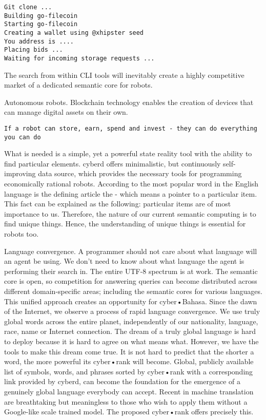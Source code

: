 \documentclass[8pt,oneside]{amsart}
\newcommand{\linkgreen}[2]{\href{#1}{\color{green}{#2}}}
\newcommand{\code}[1]{{\PlayBold #1}}
\begin{document}
\begin{Abstract}
\begin{lstlisting}
Git clone ...
Building go-filecoin
Starting go-filecoin
Creating a wallet using @xhipster seed
You address is ....
Placing bids ...
Waiting for incoming storage requests ...

\end{lstlisting}

The search from within CLI tools will inevitably create a highly competitive market of a dedicated semantic core for robots.

\code{Autonomous robots}. Blockchain technology enables the creation of devices that can manage digital assets on their own.

\begin{lstlisting}
If a robot can store, earn, spend and invest - they can do everything you can do
\end{lstlisting}

What is needed is a simple, yet a powerful state reality tool with the ability to find particular elements. \code{cyberd} offers minimalistic, but continuously self-improving data source, which provides the necessary tools for programming economically rational robots. According to \linkgreen{https://github.com/first20hours/google-10000-english}{top-10000 English words} the most popular word in the English language is the defining article \code{the} - which means a pointer to a particular item. This fact can be explained as the following: particular items are of most importance to us. Therefore, the nature of our current semantic computing is to find unique things. Hence, the understanding of unique things is essential for robots too.

\code{Language convergence}. A programmer should not care about what language will an agent be using. We don't need to know about what language the agent is performing their search in. The entire UTF-8 spectrum is at work. The semantic core is open, so competition for answering queries can become distributed across different domain-specific areas; including the semantic cores for various languages. This unified approach creates an opportunity for cyber•Bahasa. Since the dawn of the Internet, we observe a process of rapid language convergence. We use truly global words across the entire planet, independently of our nationality, language, race, name or Internet connection. The dream of a truly global language is hard to deploy because it is hard to agree on what means what. However, we have the tools to make this dream come true. It is not hard to predict that the shorter a word, the more powerful its cyber•rank will become. Global, publicly available list of symbols, words, and phrases sorted by cyber•rank with a corresponding link provided by cyberd, can become the foundation for the emergence of a genuinely global language everybody can accept. Recent \linkgreen{https://ipfs.io/ipfs/QmQUWBhDMfPKgFt3NfbxM1VU22oU8CRepUzGPBDtopwap1}{scientific advances} in machine translation are breathtaking but meaningless to those who wish to apply them without a Google-like scale trained model. The proposed cyber•rank offers precisely this.


\end{Abstract}
\end{document}

